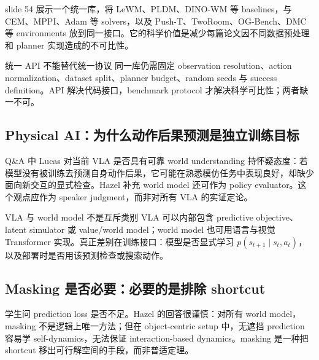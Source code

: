 slide 54 展示一个统一库，将 LeWM、PLDM、DINO-WM 等 baselines，与 CEM、MPPI、Adam 等 solvers，以及 Push-T、TwoRoom、OG-Bench、DMC 等 environments 放到同一接口。它的科学价值是减少每篇论文因不同数据预处理和 planner 实现造成的不可比性。



\begin{importantbox}{统一 API 不能替代统一协议}
同一库仍需固定 observation resolution、action normalization、dataset split、planner budget、random seeds 与 success definition。API 解决代码接口，benchmark protocol 才解决科学可比性；两者缺一不可。
\end{importantbox}

\subsection{Physical AI：为什么动作后果预测是独立训练目标}

Q\&A 中 Lucas 对当前 VLA 是否具有可靠 world understanding 持怀疑态度：若模型没有被训练去预测自身动作后果，它可能在熟悉模仿任务中表现良好，却缺少面向新交互的显式检查。Hazel 补充 world model 还可作为 policy evaluator。这个观点应作为 speaker judgment，而非对所有 VLA 的实证定论。


\begin{warningbox}{VLA 与 world model 不是互斥类别}
VLA 可以内部包含 predictive objective、latent simulator 或 value/world model；world model 也可用语言与视觉 Transformer 实现。真正差别在训练接口：模型是否显式学习 $p(s_{t+1}\mid s_t,a_t)$，以及部署时是否用该预测检查或搜索动作。
\end{warningbox}

\subsection{Masking 是否必要：必要的是排除 shortcut}

学生问 prediction loss 是否不足。Hazel 的回答很谨慎：对所有 world model，masking 不是逻辑上唯一方法；但在 object-centric setup 中，无遮挡 prediction 容易学 self-dynamics，无法保证 interaction-based dynamics。masking 是一种把 shortcut 移出可行解空间的手段，而非普适定理。


